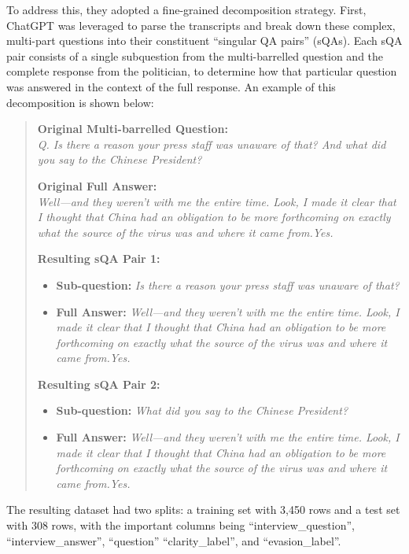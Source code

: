 \documentclass[conference]{IEEEtran}
\begin{document}
To address this, they adopted a fine-grained decomposition strategy. First, ChatGPT was leveraged to parse the transcripts and break down these complex, multi-part questions into their constituent ``singular QA pairs'' (sQAs). Each sQA pair consists of a single subquestion from the multi-barrelled question and the complete response from the politician, to determine how that particular question was answered in the context of the full response. An example of this decomposition is shown below:

\begin{quote}
\small %
\textbf{Original Multi-barrelled Question:} \\
\textit{Q. Is there a reason your press staff was unaware of that? And what did you say to the Chinese President?}

\smallskip %
\textbf{Original Full Answer:} \\
\textit{Well—and they weren't with me the entire time. Look, I made it clear that I thought that China had an obligation to be more forthcoming on exactly what the source of the virus was and where it came from.Yes.}

\smallskip

\textbf{Resulting sQA Pair 1:}
\begin{itemize}
    \item \textbf{Sub-question:} \textit{Is there a reason your press staff was unaware of that?}
    \item \textbf{Full Answer:} \textit{Well—and they weren't with me the entire time. Look, I made it clear that I thought that China had an obligation to be more forthcoming on exactly what the source of the virus was and where it came from.Yes.}
\end{itemize}

\textbf{Resulting sQA Pair 2:}
\begin{itemize}
    \item \textbf{Sub-question:} \textit{What did you say to the Chinese President?}
    \item \textbf{Full Answer:} \textit{Well—and they weren't with me the entire time. Look, I made it clear that I thought that China had an obligation to be more forthcoming on exactly what the source of the virus was and where it came from.Yes.}
\end{itemize}
\end{quote}

The resulting dataset had two splits: a training set with 3,450 rows and a test set with 308 rows, with the important columns being ``interview\_question'', ``interview\_answer'', ``question'' ``clarity\_label'', and ``evasion\_label''.
\end{document}
